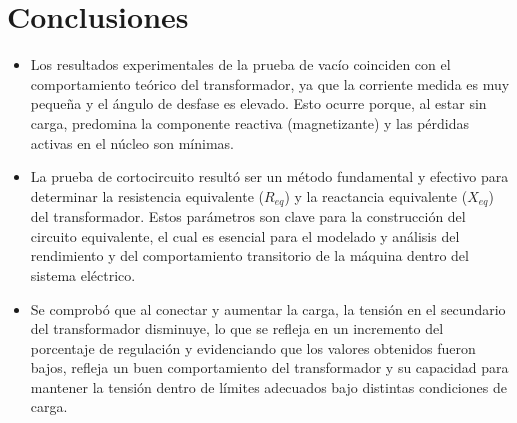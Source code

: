 \section*{Conclusiones}
\begin{itemize}
    \item Los resultados experimentales de la prueba de vacío coinciden con el comportamiento teórico del transformador, ya que la corriente medida es muy pequeña y el ángulo de desfase es elevado. Esto ocurre porque, al estar sin carga, predomina la componente reactiva (magnetizante) y las pérdidas activas en el núcleo son mínimas.
    \newline
    \item La prueba de cortocircuito resultó ser un método fundamental y efectivo para determinar la resistencia equivalente ($R_{eq}$) y la reactancia equivalente ($X_{eq}$) del transformador. Estos parámetros son clave para la construcción del circuito equivalente, el cual es esencial para el modelado y análisis del rendimiento y del comportamiento transitorio de la máquina dentro del sistema eléctrico.
    \newline
    \item Se comprobó que al conectar y aumentar la carga, la tensión en el secundario del transformador disminuye, lo que se refleja en un incremento del porcentaje de regulación y evidenciando que los valores obtenidos fueron bajos, refleja un buen comportamiento del transformador y su capacidad para mantener la tensión dentro de límites adecuados bajo distintas condiciones de carga.
\end{itemize}